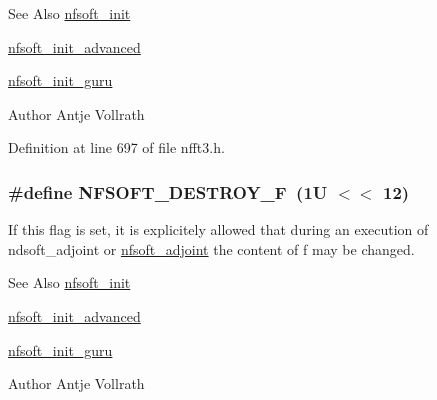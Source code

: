 \begin{DoxySeeAlso}{See Also}
\hyperlink{group__nfsoft_ga31c884458165fa204073c6c16c10775e}{nfsoft\-\_\-init} 

\hyperlink{group__nfsoft_gaf4aec4ee2a2a5d56ca27c4f1a7f90b18}{nfsoft\-\_\-init\-\_\-advanced} 

\hyperlink{group__nfsoft_ga1c13cdd3f82f48fa41acdd313cdc2052}{nfsoft\-\_\-init\-\_\-guru} 
\end{DoxySeeAlso}
\begin{DoxyAuthor}{Author}
Antje Vollrath 
\end{DoxyAuthor}


Definition at line 697 of file nfft3.\-h.

\hypertarget{group__nfsoft_ga93ab283dcb14d5b37b130e2556bb6e7d}{
\subsubsection[{N\-F\-S\-O\-F\-T\-\_\-\-D\-E\-S\-T\-R\-O\-Y\-\_\-\-F}]{\setlength{\rightskip}{0pt plus 5cm}\#define N\-F\-S\-O\-F\-T\-\_\-\-D\-E\-S\-T\-R\-O\-Y\-\_\-\-F~(1\-U $<$$<$ 12)}}\label{group__nfsoft_ga93ab283dcb14d5b37b130e2556bb6e7d}
If this flag is set, it is explicitely allowed that during an execution of ndsoft\-\_\-adjoint or \hyperlink{group__nfsoft_ga08395b1dd90f9a2565685d17460afc5b}{nfsoft\-\_\-adjoint} the content of {\ttfamily f} may be changed.

\begin{DoxySeeAlso}{See Also}
\hyperlink{group__nfsoft_ga31c884458165fa204073c6c16c10775e}{nfsoft\-\_\-init} 

\hyperlink{group__nfsoft_gaf4aec4ee2a2a5d56ca27c4f1a7f90b18}{nfsoft\-\_\-init\-\_\-advanced} 

\hyperlink{group__nfsoft_ga1c13cdd3f82f48fa41acdd313cdc2052}{nfsoft\-\_\-init\-\_\-guru} 
\end{DoxySeeAlso}
\begin{DoxyAuthor}{Author}
Antje Vollrath 
\end{DoxyAuthor}


